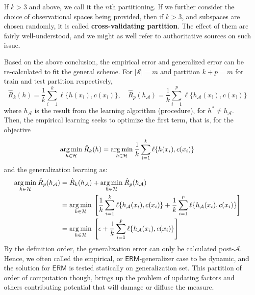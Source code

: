 If $k>3$ and above, we call it the $n$th partitioning. If we further consider the choice of observational spaces being provided, then if $k>3$, and subspaces are chosen randomly, it is called \textbf{cross-validating partition}. The effect of them are fairly well-understood, and we might as well refer to authoritative sources on such issue. 

Based on the above conclusion, the empirical error and generalized error can be re-calculated to fit the general scheme. For $\lvert \mathcal{S}\rvert = m$ and partition $k+p=m$ for train and test partition respectively, 
\begin{equation}
    \hat{R}_{k}(h) = \frac{1}{k} \sum^{k}_{i=1} \ell\{h(x_{i}),c(x_{i})\},\quad \hat{R}_{p}(h_{\mathcal{A}}) = \frac{1}{k} \sum^{p}_{i=1} \ell\{h_{\mathcal{A}}(x_{i}),c(x_{i})\}
\end{equation}
where $h_{\mathcal{A}}$ is the result from the learning algorithm (procedure), for $h^{*}\neq h_{\mathcal{A}}$. Then, the empirical learning seeks to optimize the first term, that is, for the objective 
\begin{equation}
    \underset{h\in \mathcal{H}}{\operatorname*{arg\,min}}\: \hat{R}_{k}(h) = \underset{h\in \mathcal{H}}{\operatorname*{arg\,min}}\:\frac{1}{k} \sum^{k}_{i=1} \ell\{h(x_{i}),c(x_{i})\}
\end{equation}
and the generalization learning as: 
\begin{equation}
    \begin{split}
        \underset{h\in \mathcal{H}}{\operatorname*{arg\,min}}\: \hat{R}_{p}(h_{\mathcal{A}}) 
        & = \hat{R}_{k}(h_{\mathcal{A}}) + \underset{h\in \mathcal{H}}{\operatorname*{arg\,min}}\:\hat{R}_{p}(h_{\mathcal{A}})\\
        & =  \underset{h\in \mathcal{H}}{\operatorname*{arg\,min}}\: \left[\frac{1}{k} \sum^{k}_{i=1} \ell\{h_{\mathcal{A}}(x_{i}),c(x_{i})\} + \frac{1}{k} \sum^{p}_{i=1} \ell\{h_{\mathcal{A}}(x_{i}),c(x_{i})\}\right]\\
        & = \underset{h\in \mathcal{H}}{\operatorname*{arg\,min}}\: \left[\epsilon + \frac{1}{k} \sum^{p}_{i=1} \ell\{h_{\mathcal{A}}(x_{i}),c(x_{i})\}\right]
    \end{split}
\end{equation}
By the definition order, the generalization error can only be calculated post-$\mathcal{A}$. Hence, we often called the empirical, or $\mathsf{ERM}$-generalizer case to be dynamic, and the solution for $\mathsf{ERM}$ is tested statically on generalization set. This partition of order of computation though, brings up the problem of updating factors and others contributing potential that will damage or diffuse the measure. 

